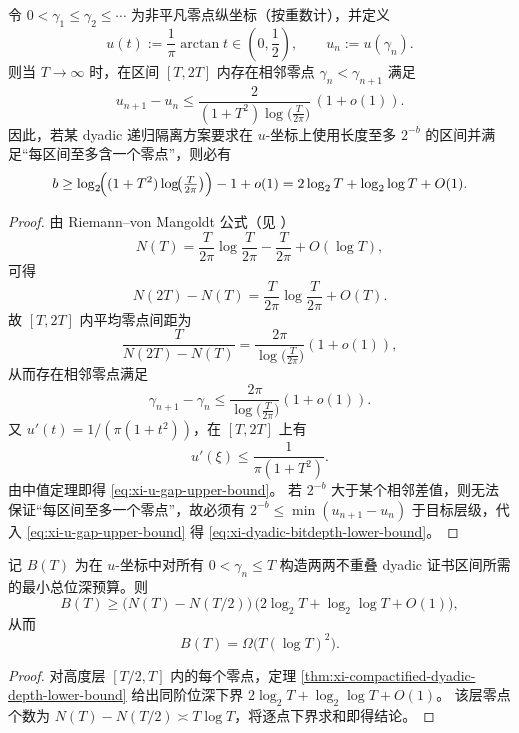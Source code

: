 \begin{theorem}\label{thm:xi-compactified-dyadic-depth-lower-bound}
令 \(0<\gamma_1\le\gamma_2\le\cdots\) 为非平凡零点纵坐标（按重数计），并定义
\[
u(t):=\frac{1}{\pi}\arctan t\in\left(0,\frac12\right),\qquad
u_n:=u(\gamma_n).
\]
则当 \(T\to\infty\) 时，在区间 \([T,2T]\) 内存在相邻零点
\(\gamma_n<\gamma_{n+1}\) 满足
\begin{equation}\label{eq:xi-u-gap-upper-bound}
u_{n+1}-u_n
\le
\frac{2}{(1+T^2)\log\!\bigl(\frac{T}{2\pi}\bigr)}\,(1+o(1)).
\end{equation}
因此，若某 dyadic 递归隔离方案要求在 \(u\)-坐标上使用长度至多 \(2^{-b}\) 的区间并满足“每区间至多含一个零点”，则必有
\begin{equation}\label{eq:xi-dyadic-bitdepth-lower-bound}
b\ge
\log_2\!\Bigl((1+T^2)\log\!\bigl(\tfrac{T}{2\pi}\bigr)\Bigr)-1+o(1)
=2\log_2 T+\log_2\log T+O(1).
\end{equation}
\end{theorem}
\begin{proof}
由 Riemann--von Mangoldt 公式（见 \cite{Titchmarsh1986RiemannZeta}）
\[
N(T)=\frac{T}{2\pi}\log\frac{T}{2\pi}-\frac{T}{2\pi}+O(\log T),
\]
可得
\[
N(2T)-N(T)=\frac{T}{2\pi}\log\frac{T}{2\pi}+O(T).
\]
故 \([T,2T]\) 内平均零点间距为
\[
\frac{T}{N(2T)-N(T)}
=\frac{2\pi}{\log\!\bigl(\frac{T}{2\pi}\bigr)}(1+o(1)),
\]
从而存在相邻零点满足
\[
\gamma_{n+1}-\gamma_n
\le
\frac{2\pi}{\log\!\bigl(\frac{T}{2\pi}\bigr)}(1+o(1)).
\]
又 \(u'(t)=1/(\pi(1+t^2))\)，在 \([T,2T]\) 上有
\[
u'(\xi)\le \frac{1}{\pi(1+T^2)}.
\]
由中值定理即得 \eqref{eq:xi-u-gap-upper-bound}。
若 \(2^{-b}\) 大于某个相邻差值，则无法保证“每区间至多一个零点”，故必须有
\(
2^{-b}\le \min(u_{n+1}-u_n)
\)
于目标层级，代入 \eqref{eq:xi-u-gap-upper-bound} 得 \eqref{eq:xi-dyadic-bitdepth-lower-bound}。
\end{proof}

\begin{corollary}[递归零点证书的总比特复杂度下界]\label{cor:xi-recursive-certificate-bit-complexity-lower-bound}
记 \(B(T)\) 为在 \(u\)-坐标中对所有 \(0<\gamma_n\le T\) 构造两两不重叠 dyadic 证书区间所需的最小总位深预算。则
\[
B(T)\ge
\bigl(N(T)-N(T/2)\bigr)\,
\bigl(2\log_2T+\log_2\log T+O(1)\bigr),
\]
从而
\[
B(T)=\Omega\!\bigl(T(\log T)^2\bigr).
\]
\end{corollary}
\begin{proof}
对高度层 \([T/2,T]\) 内的每个零点，定理 \ref{thm:xi-compactified-dyadic-depth-lower-bound}
给出同阶位深下界 \(2\log_2T+\log_2\log T+O(1)\)。
该层零点个数为 \(N(T)-N(T/2)\asymp T\log T\)，将逐点下界求和即得结论。
\end{proof}

\endinput
